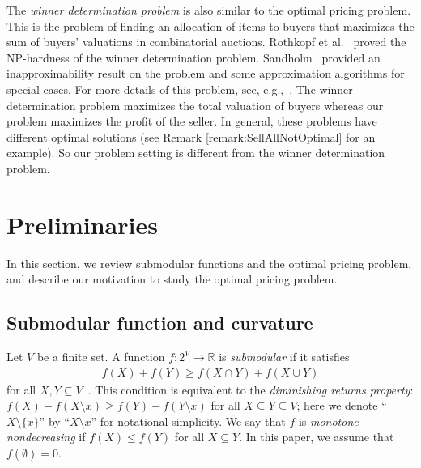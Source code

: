 \documentclass[letterpaper]{article}
\theoremstyle{definition}
\begin{document}
The \emph{winner determination problem} is also similar to the optimal pricing problem. 
This is the problem of finding an allocation of items to buyers that maximizes the sum of buyers' valuations in combinatorial auctions. 
Rothkopf et al.~ proved the NP-hardness of the winner determination problem. %
Sandholm~ provided an inapproximability result on the problem and some approximation algorithms for special cases.
For more details of this problem, see, e.g.,~\cite{nisan2007algorithmic11,cramton2006combinatorial}.
The winner determination problem maximizes the total valuation of buyers whereas our problem maximizes the profit of the seller.
In general, these problems have different optimal solutions (see Remark \ref{remark:SellAllNotOptimal} for an example). 
So our problem setting is different from the winner determination problem. 



\section{Preliminaries}
\label{sec:preliminaries}

In this section, we review submodular functions and the optimal pricing problem, and describe our motivation to study the optimal pricing problem. 



\subsection{Submodular function and curvature}

Let $V$ be a finite set.
A function $f: 2^V \to \mathbb{R}$ is \emph{submodular} if it satisfies
\begin{align}
  \label{eq:submodular}
  f(X) + f(Y) \ge f(X \cap Y) + f(X \cup Y)
\end{align}
for all $X, Y \subseteq V$~\cite{fujishige2005submodular}.
This condition is equivalent to the \emph{diminishing returns property}:
$f(X) - f(X \setminus x) \ge f(Y) - f(Y \setminus x)$
for all $X \subseteq Y \subseteq V$;
here we denote ``$X \setminus \{x\}$'' by ``$X \setminus x$'' for notational simplicity. 
We say that $f$ is \emph{monotone nondecreasing} if $f(X) \le f(Y)$ for all $X \subseteq Y$.
In this paper, we assume that $f(\emptyset) = 0$.
\end{document}
